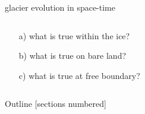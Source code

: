 \documentclass[10pt,dvipsnames]{beamer}
\begin{document}
\begin{frame}{glacier evolution in space-time }

\bigskip \bigskip

\begin{columns}
\begin{column}{0.28\textwidth}
\begin{itemize}
\item[a)] what is true within the {\color{RoyalBlue} ice}?
\item[b)] what is true on {\color{OliveGreen} bare land}?
\item[c)] what is true at {\color{Salmon} free boundary}?
\end{itemize}\end{column}
\begin{column}{0.72\textwidth}
\end{column}
\end{columns}
\end{frame}


\begin{frame}{Outline}
  [sections numbered]
  \tableofcontents[hideallsubsections]
\end{frame}
\end{document}
